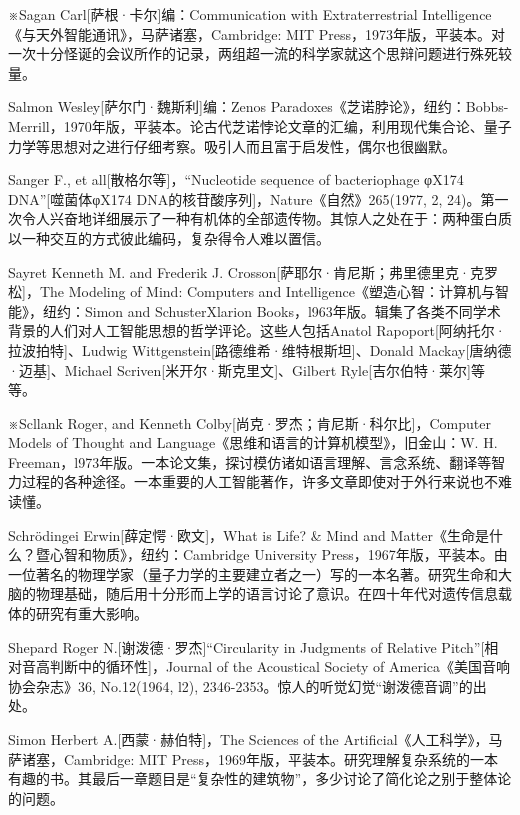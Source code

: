 \documentclass[
  12pt,
  twoside,
  openright,
  oldfontcommands,
]{memoir}
\begin{document}
※Sagan Carl{[}萨根·卡尔{]}编：Communication with Extraterrestrial Intelligence《与天外智能通讯》，马萨诸塞，Cambridge: MIT Press，1973年版，平装本。对一次十分怪诞的会议所作的记录，两组超一流的科学家就这个思辩问题进行殊死较量。

Salmon Wesley{[}萨尔门·魏斯利{]}编：Zeno\textquotesingle s Paradoxes《芝诺脖论》，纽约：Bobbs-Merrill，1970年版，平装本。论古代芝诺悖论文章的汇编，利用现代集合论、量子力学等思想对之进行仔细考察。吸引人而且富于启发性，偶尔也很幽默。

Sanger F., et all{[}散格尔等{]}，``Nucleotide sequence of bacteriophage φX174 DNA''{[}噬菌体φX174 DNA的核苷酸序列{]}，Nature《自然》265(1977, 2, 24)。第一次令人兴奋地详细展示了一种有机体的全部遗传物。其惊人之处在于：两种蛋白质以一种交互的方式彼此编码，复杂得令人难以置信。

Sayret Kenneth M. and Frederik J. Crosson{[}萨耶尔·肯尼斯；弗里德里克·克罗松{]}，The Modeling of Mind: Computers and Intelligence《塑造心智：计算机与智能》，纽约：Simon and SchusterXlarion Books，l963年版。辑集了各类不同学术背景的人们对人工智能思想的哲学评论。这些人包括Anatol Rapoport{[}阿纳托尔·拉波拍特{]}、Ludwig Wittgenstein{[}路德维希·维特根斯坦{]}、Donald Mackay{[}唐纳德·迈基{]}、Michael Scriven{[}米开尔·斯克里文{]}、Gilbert Ryle{[}吉尔伯特·莱尔{]}等等。

※Scllank Roger, and Kenneth Colby{[}尚克·罗杰；肯尼斯·科尔比{]}，Computer Models of Thought and Language《思维和语言的计算机模型》，旧金山：W. H. Freeman，l973年版。一本论文集，探讨模仿诸如语言理解、言念系统、翻译等智力过程的各种途径。一本重要的人工智能著作，许多文章即使对于外行来说也不难读懂。

Schrödingei Erwin{[}薛定愕·欧文{]}，What is Life? \& Mind and Matter《生命是什么？暨心智和物质》，纽约：Cambridge University Press，1967年版，平装本。由一位著名的物理学家（量子力学的主要建立者之一）写的一本名著。研究生命和大脑的物理基础，随后用十分形而上学的语言讨论了意识。在四十年代对遗传信息载体的研究有重大影响。

Shepard Roger N.{[}谢泼德·罗杰{]}``Circularity in Judgments of Relative Pitch''{[}相对音高判断中的循环性{]}，Journal of the Acoustical Society of America《美国音响协会杂志》36, No.12(1964, l2), 2346-2353。惊人的听觉幻觉``谢泼德音调''的出处。

Simon Herbert A.{[}西蒙·赫伯特{]}，The Sciences of the Artificial《人工科学》，马萨诸塞，Cambridge: MIT Press，1969年版，平装本。研究理解复杂系统的一本有趣的书。其最后一章题目是``复杂性的建筑物''，多少讨论了简化论之别于整体论的问题。
\end{document}
